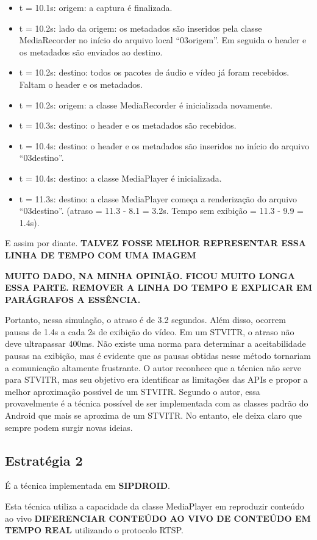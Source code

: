 \documentclass{acm_proc_article-sp}
\newcommand{\todo}[1]{\textcolor[rgb]{1.00,0.00,0.00}{\bf \uppercase{#1}}}
\begin{document}
\begin{itemize}
 \item t = 10.1s: origem: a captura é finalizada.
 \item t = 10.2s: lado da origem: os metadados são inseridos pela classe MediaRecorder no início do arquivo local “03origem”. Em seguida o header e os metadados são enviados ao destino.
 \item t = 10.2s: destino: todos os pacotes de áudio e vídeo já foram recebidos. Faltam o header e os metadados.
 \item t = 10.2s: origem: a classe MediaRecorder é inicializada novamente.
 \item t = 10.3s: destino: o header e os metadados são recebidos.
 \item t = 10.4s: destino: o header e os metadados são inseridos no início do arquivo “03destino”.
 \item t = 10.4s: destino: a classe MediaPlayer é inicializada.
 \item t = 11.3s: destino: a classe MediaPlayer começa a renderização do arquivo “03destino”. (atraso = 11.3 - 8.1 = 3.2s. Tempo sem exibição = 11.3 - 9.9 = 1.4s).
\end{itemize}

E assim por diante. \todo{talvez fosse melhor representar essa linha de tempo com uma imagem}

\todo{muito dado, na minha opinião. ficou muito longa essa parte. remover a linha do tempo e explicar em parágrafos a essência.}

Portanto, nessa simulação, o atraso é de 3.2 segundos. Além disso, ocorrem pausas de 1.4s a cada 2s de exibição do vídeo. Em um STVITR, o atraso não deve ultrapassar 400ms. Não existe uma norma para determinar a aceitabilidade pausas na exibição, mas é evidente que as pausas obtidas nesse método tornariam a comunicação altamente frustrante. O autor reconhece que a técnica não serve para STVITR, mas seu objetivo era identificar as limitações das APIs e propor a melhor aproximação possível de um STVITR. Segundo o autor, essa provavelmente é a técnica possível de ser implementada com as classes padrão do Android que mais se aproxima de um STVITR. No entanto, ele deixa claro que sempre podem surgir novas ideias. 

\subsection{Estratégia 2}
É a técnica implementada em \todo{sipdroid}.

Esta técnica utiliza a capacidade da classe MediaPlayer em reproduzir conteúdo ao vivo \todo{diferenciar conteúdo ao vivo de conteúdo em tempo real} utilizando o protocolo RTSP.
\end{document}
